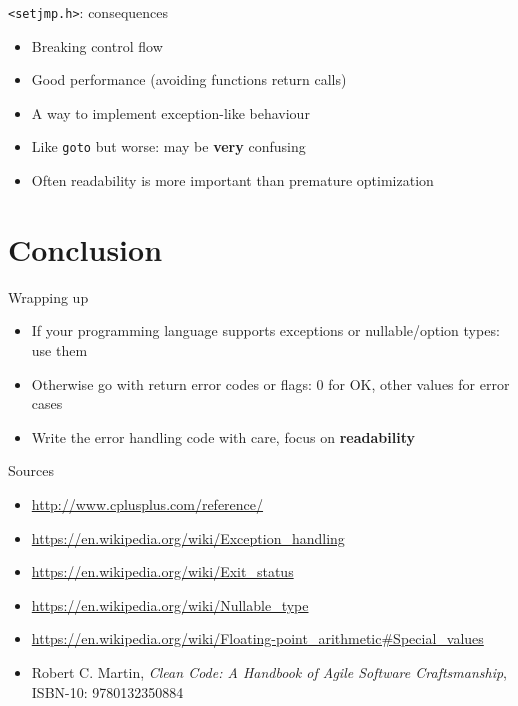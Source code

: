 \documentclass[aspectratio=169,14pt]{beamer}
\begin{document}
\begin{frame}{\texttt{<setjmp.h>}: consequences}
\begin{itemize}
    \item[\good] Breaking control flow
    \item[\good] Good performance (avoiding functions return calls)
    \item[\good] A way to implement exception-like behaviour
    \item[\bad] Like \texttt{goto} but worse: may be \textbf{very} confusing
    \item[\bad] Often readability is more important than premature optimization
\end{itemize}
\end{frame}





\section{Conclusion}

\begin{frame}{Wrapping up}
\begin{itemize}
    \item If your programming language supports exceptions or nullable/option types: use them
    \item Otherwise go with return error codes or flags: 0 for OK, other values for error cases
    \item Write the error handling code with care, focus on \textbf{readability}
\end{itemize}
\end{frame}



\begin{frame}{Sources}
\begin{small}
    \begin{itemize}
        \item \url{http://www.cplusplus.com/reference/}
        \item \url{https://en.wikipedia.org/wiki/Exception_handling}
        \item \url{https://en.wikipedia.org/wiki/Exit_status}
        \item \url{https://en.wikipedia.org/wiki/Nullable_type}
        \item \url{https://en.wikipedia.org/wiki/Floating-point_arithmetic\#Special_values}
        \item Robert C. Martin, \textit{Clean Code: A Handbook of Agile Software Craftsmanship}, ISBN-10: 9780132350884 
    \end{itemize}
\end{small}
\end{frame}



\end{document}
